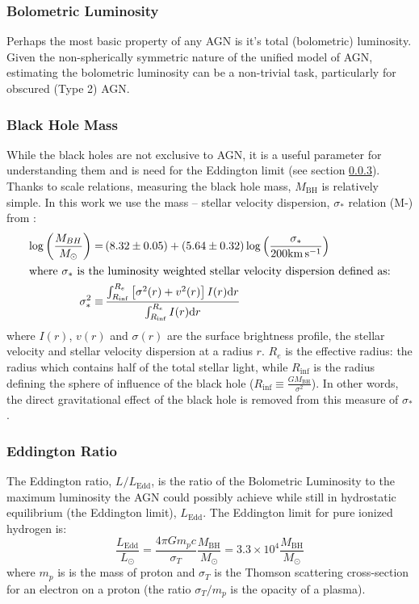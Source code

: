 {{		\subsubsection{Bolometric Luminosity}
			Perhaps the most basic property of any AGN is it's total (bolometric) luminosity. Given the non-spherically symmetric nature of the unified model of AGN, estimating the bolometric luminosity can be a non-trivial task, particularly for obscured (Type 2) AGN. 

		\subsubsection{Black Hole Mass}
			While the black holes are not exclusive to AGN, it is a useful parameter for understanding them and is need for the Eddington limit (see section \ref{subsubsec:introEddington}). Thanks to scale relations, measuring the black hole mass, $M_\mathrm{BH}$ is relatively simple. In this work we use the mass -- stellar velocity dispersion, $\sigma_\ast$ relation (M-\textsigma) from \citet{McConnell2013}:
			\begin{align}
				\log\left(\frac{M_{BH}}{M_\odot}\right) = & \, (8.32 \pm 0.05) + (5.64 \pm 0.32) \log\left(\frac{\sigma_\ast}{200 \mathrm{km \, s^{-1}}}\right) \\
				\intertext{where $\sigma_\ast$ is the luminosity weighted stellar velocity dispersion defined as:} 
				\sigma_\ast^2 \equiv & \, \frac{\int_{R_\mathrm{inf}}^{R_e} \left[\sigma^2(r) + v^2(r)\right] I(r) \mathrm{d}r}{\int_{R_\mathrm{inf}}^{R_e} I(r) \mathrm{d}r}
			\end{align}
			where $I(r)$, $v(r)$ and $\sigma(r)$ are the surface brightness profile, the stellar velocity and stellar velocity dispersion at a radius $r$. $R_e$ is the effective radius: the radius which contains half of the total stellar light, while $R_\mathrm{inf}$ is the radius defining the sphere of influence of the black hole ($R_\mathrm{inf} \equiv \frac{GM_\mathrm{BH}}{\sigma^2}$). In other words, the direct gravitational effect of the black hole is removed from this measure of $\sigma_\ast$. %


		\subsubsection{Eddington Ratio}
			\label{subsubsec:introEddington}
			The Eddington ratio, $L/L_\mathrm{Edd}$, is the ratio of the Bolometric Luminosity to the maximum luminosity the AGN could possibly achieve while still in hydrostatic equilibrium (the Eddington limit), $L_\mathrm{Edd}$. The Eddington limit for pure ionized hydrogen is:
			\begin{equation}
				\frac{L_\mathrm{Edd}}{L_\odot} = \frac{4 \pi G m_p c}{\sigma_T}	\frac{M_\mathrm{BH}}{M_\odot} = 3.3 \times 10^4 \frac{M_\mathrm{BH}}{M_\odot}
			\end{equation}
			where $m_p$ is is the mass of proton and $\sigma_T$ is the Thomson scattering cross-section for an electron on a proton (the ratio $\sigma_T/m_p$ is the opacity of a plasma). 

}}
